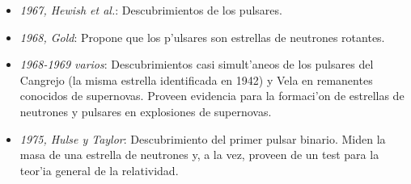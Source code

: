 \begin{itemize}
\item \emph{1967, Hewish et al.}: Descubrimientos de los pulsares.
\item \emph{1968, Gold}: Propone que los p'ulsares son estrellas de neutrones rotantes.
\item \emph{1968-1969 varios}: Descubrimientos casi simult'aneos de los pulsares del Cangrejo (la misma estrella identificada en 1942) y Vela en remanentes conocidos de supernovas. Proveen evidencia para la formaci'on de estrellas de neutrones y pulsares en explosiones de supernovas.
\item \emph{1975, Hulse y Taylor}: Descubrimiento del primer pulsar binario. Miden la masa de una estrella de neutrones y, a la vez, proveen de un test para la teor'ia general de la relatividad.
\end{itemize}
